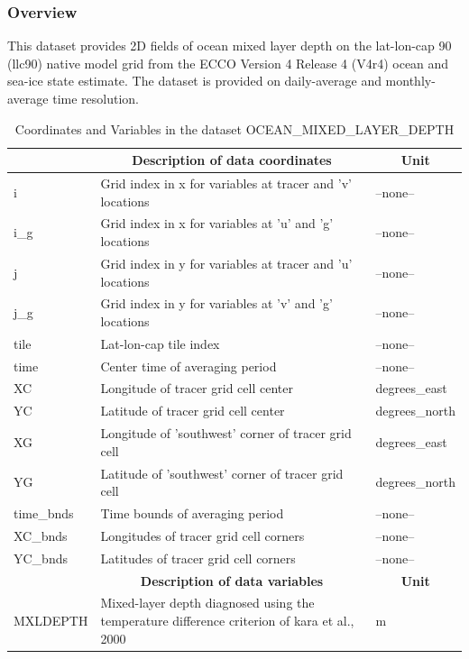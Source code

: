 \subsubsection{Overview}
This dataset provides 2D fields of ocean mixed layer depth on the lat-lon-cap 90 (llc90) native model grid from the ECCO Version 4 Release 4 (V4r4) ocean and sea-ice state estimate. The dataset is provided on daily-average and monthly-average time resolution. 
\begin{longtable}{|m{}|m{}|m{}|}
\caption{Coordinates and Variables in the dataset OCEAN\_MIXED\_LAYER\_DEPTH}
\label{tab:table-OCEAN_MIXED_LAYER_DEPTH-fields} \\ 
\hline \endhead \hline \endfoot
\rowcolor{lightgray} \multicolumn{1}{|c|}{\textbf{Coordinates}} & \multicolumn{1}{|c|}{\textbf{Description of data coordinates}} &  \multicolumn{1}{|c|}{\textbf{Unit}}\\ \hline
i &Grid index in x for variables at tracer and 'v' locations &--none--  \\ \hline
i\_g &Grid index in x for variables at 'u' and 'g' locations &--none--  \\ \hline
j &Grid index in y for variables at tracer and 'u' locations &--none--  \\ \hline
j\_g &Grid index in y for variables at 'v' and 'g' locations &--none--  \\ \hline
tile &Lat-lon-cap tile index &--none--  \\ \hline
time &Center time of averaging period &--none--  \\ \hline
XC &Longitude of tracer grid cell center &degrees\_east  \\ \hline
YC &Latitude of tracer grid cell center &degrees\_north  \\ \hline
XG &Longitude of 'southwest' corner of tracer grid cell &degrees\_east  \\ \hline
YG &Latitude of 'southwest' corner of tracer grid cell &degrees\_north  \\ \hline
time\_bnds &Time bounds of averaging period &--none--  \\ \hline
XC\_bnds &Longitudes of tracer grid cell corners &--none--  \\ \hline
YC\_bnds &Latitudes of tracer grid cell corners &--none--  \\ \hline
\rowcolor{lightgray} \multicolumn{1}{|c|}{\textbf{Variables}} & \multicolumn{1}{|c|}{\textbf{Description of data variables}} &  \multicolumn{1}{|c|}{\textbf{Unit}}\\ \hline
MXLDEPTH &Mixed-layer depth diagnosed using the temperature difference criterion of kara et al., 2000 &m  \\ \hline
\end{longtable}

